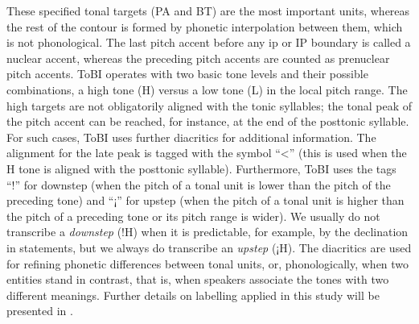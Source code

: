 These specified tonal targets (PA and BT) are the most important units, where\-as the rest of the contour is formed by phonetic interpolation between them, which is not phonological. The last pitch accent before any ip or IP boundary is called a nuclear accent, whereas the preceding pitch accents are counted as prenuclear pitch accents. ToBI operates with two basic tone levels and their possible combinations, a high tone (H) versus a low tone (L) in the local pitch range. The high targets are not obligatorily aligned with the tonic syllables; the tonal peak of the pitch accent can be reached, for instance, at the end of the posttonic syllable. For such cases, ToBI uses further diacritics for additional information. The alignment for the late peak is tagged with the symbol ``<'' (this is used when the H tone is aligned with the posttonic syllable). Furthermore, ToBI uses the tags ``!'' for downstep (when the pitch of a tonal unit is lower than the pitch of the preceding tone) and ``¡'' for upstep (when the pitch of a tonal unit is higher than the pitch of a preceding tone or its pitch range is wider). We usually do not transcribe a \textit{downstep} (!H) when it is predictable, for example, by the declination in statements, but we always do transcribe an \textit{upstep} (¡H). The diacritics are used for refining phonetic differences between tonal units, or, phonologically, when two entities stand in contrast, that is, when speakers associate the tones with two different meanings. Further details on labelling applied in this study will be presented in .



